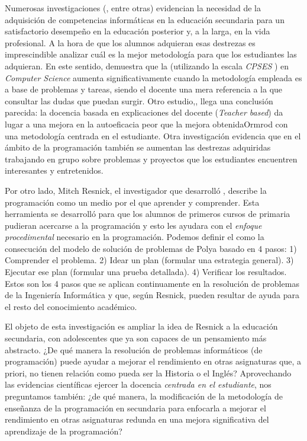 \documentclass[palatino,miniheader]{apuntesURJC}
\newcommand{\CPSES}{\textit{\gls{CPSES}} \cite{CPSES}}
\begin{document}
Numerosas investigaciones (\cite{CSIsImportant},\cite{CSArguing} entre otras) evidencian la necesidad de la adquisición de competencias informáticas en la educación secundaria para un satisfactorio desempeño en la educación posterior y, a la larga, en la vida profesional.
%
A la hora de que los alumnos adquieran esas destrezas es imprescindible analizar cuál es la mejor metodología para que los estudiantes las adquieran.
%
En este sentido, \cite{StudentCenter} demuestra que la  (utilizando la escala \CPSES) en \textit{Computer Science} aumenta significativamente cuando la metodología empleada es a base de problemas y tareas, siendo el docente una mera referencia a la que consultar las dudas que puedan surgir.
%
\label{studentbased}
%
Otro estudio,\cite{StudentCenterVSLectures}, llega una conclusión parecida:
%
la docencia basada en explicaciones del docente (\textit{Teacher based}) da lugar a una mejora en la autoeficacia peor que la mejora obtenidaOrmrod con una metodología centrada en el estudiante.
%
\label{groupsbased}
%
Otra investigación \cite{ABPCS} evidencia que en el ámbito de la programación también se aumentan las destrezas adquiridas trabajando en grupo sobre problemas y proyectos que los estudiantes encuentren interesantes y entretenidos. 


Por otro lado, Mitch Resnick, el investigador que desarrolló  \cite{scratch}, describe la programación como un medio por el que aprender y comprender.
%
Esta herramienta se desarrolló para que los alumnos de primeros cursos de primaria pudieran acercarse a la programación y esto les ayudara con el \textit{enfoque procedimental} necesario en la programación.
%
Podemos definir el  como la consecución del modelo de solución de problemas de Polya \cite{Polya} basado en 4 pasos:
1) Comprender el problema. 2) Idear un plan (formular una estrategia general). 3) Ejecutar ese plan (formular una prueba detallada). 4) Verificar los resultados. 
%
Estos son los 4 pasos que se aplican continuamente en la resolución de problemas de la Ingeniería Informática y que, según Resnick, pueden resultar de ayuda para el resto del conocimiento académico.

El objeto de esta investigación es ampliar la idea de Resnick a la educación secundaria, con adolescentes que ya son capaces de un pensamiento más abstracto.
%
¿De qué manera la resolución de problemas informáticos (de programación) puede ayudar a mejorar el rendimiento en otras asignaturas que, a priori, no tienen relación como pueda ser la Historia o el Inglés?
%
Aprovechando las evidencias científicas ejercer la docencia \textit{centrada en el estudiante}, nos preguntamos también:
%
¿de qué manera, la modificación de la metodología de enseñanza de la programación en secundaria para enfocarla a mejorar el rendimiento en otras asignaturas redunda en una mejora significativa del aprendizaje de la programación?
\end{document}
